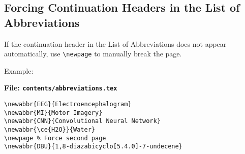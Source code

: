 \documentclass{VISTEC}
\begin{document}
\subsection{Forcing Continuation Headers in the List of Abbreviations}

\begin{subparagraph}
If the continuation header in the List of Abbreviations does not appear automatically, use \verb|\newpage| to manually break the page.
\end{subparagraph}

\begin{subparagraph}
Example:
\end{subparagraph}

\noindent\textbf{File: \texttt{contents/abbreviations.tex}}\vspace{-1.5em}
\begin{verbatim}
\newabbr{EEG}{Electroencephalogram}
\newabbr{MI}{Motor Imagery}
\newabbr{CNN}{Convolutional Neural Network}
\newabbr{\ce{H2O}}{Water}
\newpage % Force second page
\newabbr{DBU}{1,8-diazabicyclo[5.4.0]-7-undecene}
\end{verbatim}
\end{document}
